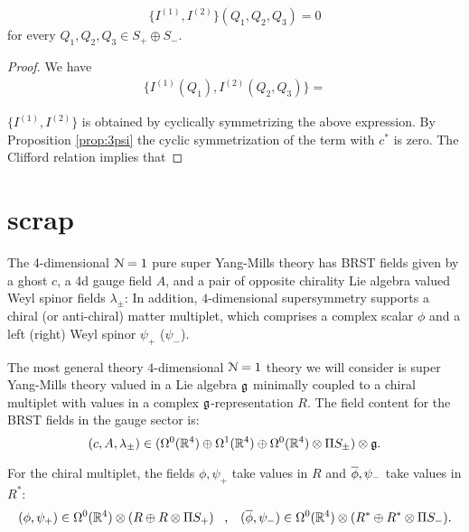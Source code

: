\documentclass[10pt, oneside]{article}
\begin{document}
\begin{lemma}
\[\{I^{(1)}, I^{(2)}\}(Q_1, Q_2, Q_3) = 0\]
for every $Q_1, Q_2, Q_3\in S_+ \oplus S_-$.
\end{lemma}
\begin{proof}
We have
\begin{align*}
\{I^{(1)}(Q_1), I^{(2)}(Q_2, Q_3)\} = 
\end{align*}

$\{I^{(1)}, I^{(2)}\}$ is obtained by cyclically symmetrizing the above expression. By Proposition \ref{prop:3psi} the cyclic symmetrization of the term with $c^*$ is zero. The Clifford relation implies that
\end{proof}

\section{scrap}

The 4-dimensional $\mc N=1$ pure super Yang-Mills theory has BRST fields given by a ghost $c$, a 4d gauge field $A$, and a pair of opposite chirality Lie algebra valued Weyl spinor fields $\lambda_\pm$:
In addition, $4$-dimensional supersymmetry supports a chiral (or anti-chiral) matter multiplet, which comprises a complex scalar $\phi$ and a left (right) Weyl spinor $\psi_+$ ($\psi_-$).

The most general theory $4$-dimensional $\mc N = 1$ theory we will consider is super Yang-Mills theory valued in a Lie algebra $\fg$ minimally coupled to a chiral multiplet with values in a complex $\fg$-representation $R$. 
The field content for the BRST fields in the gauge sector is:
\[
(c, A, \lambda_\pm) \in (\Omega^0(\RR^4) \oplus \Omega^1(\RR^4) \oplus \Omega^0(\RR^4) \otimes \Pi S_\pm) \otimes \fg .
\]

For the chiral multiplet, the fields $\phi, \psi_+$ take values in $R$ and $\Bar{\phi}, \psi_-$ take values in $R^*$:
\[
(\phi, \psi_+) \in \Omega^0(\RR^4) \otimes (R \oplus R \otimes \Pi S_+) \;\;\; , \;\;\; (\Bar{\phi}, \psi_-) \in \Omega^0(\RR^4) \otimes (R^* \oplus R^* \otimes \Pi S_-) .
\]
\end{document}
